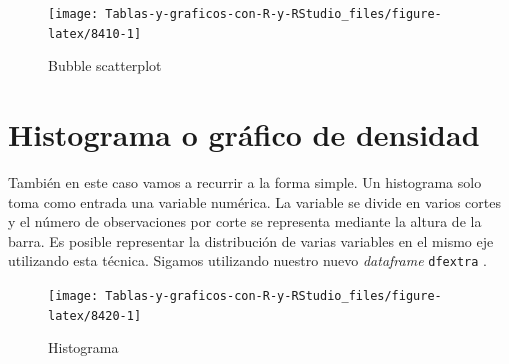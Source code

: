 \documentclass[
]{book}
\newenvironment{Shaded}{\begin{snugshade}}{\end{snugshade}}
\newcommand{\AttributeTok}[1]{\textcolor[rgb]{0.77,0.63,0.00}{#1}}
\newcommand{\ConstantTok}[1]{\textcolor[rgb]{0.00,0.00,0.00}{#1}}
\newcommand{\FunctionTok}[1]{\textcolor[rgb]{0.00,0.00,0.00}{#1}}
\newcommand{\NormalTok}[1]{#1}
\newcommand{\SpecialCharTok}[1]{\textcolor[rgb]{0.00,0.00,0.00}{#1}}
\newcommand{\StringTok}[1]{\textcolor[rgb]{0.31,0.60,0.02}{#1}}
\begin{document}
\begin{figure}[H]

{\centering \texttt{[image: Tablas-y-graficos-con-R-y-RStudio\_files/figure-latex/8410-1]} 

}

\caption{Bubble scatterplot}\label{fig:8410}
\end{figure}

\hypertarget{histograma-o-gruxe1fico-de-densidad}{%
\section{Histograma o gráfico de densidad}\label{histograma-o-gruxe1fico-de-densidad}}

También en este caso vamos a recurrir a la forma simple. Un histograma solo toma como entrada una variable numérica. La variable se divide en varios cortes y el número de observaciones por corte se representa mediante la altura de la barra. Es posible representar la distribución de varias variables en el mismo eje utilizando esta técnica. Sigamos utilizando nuestro nuevo \emph{dataframe} \texttt{dfextra} .

\begin{Shaded}
\end{Shaded}

\begin{figure}[H]

{\centering \texttt{[image: Tablas-y-graficos-con-R-y-RStudio\_files/figure-latex/8420-1]} 

}

\caption{Histograma}\label{fig:8420}
\end{figure}
\end{document}
